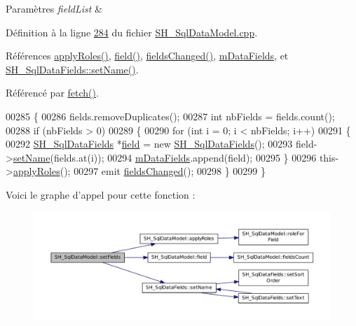 \begin{DoxyParams}{Paramètres}
{\em field\-List} & \\
\hline
\end{DoxyParams}


Définition à la ligne \hyperlink{SH__SqlDataModel_8cpp_source_l00284}{284} du fichier \hyperlink{SH__SqlDataModel_8cpp_source}{S\-H\-\_\-\-Sql\-Data\-Model.\-cpp}.



Références \hyperlink{classSH__SqlDataModel_ad4f032ceb7c2f70b2d7388e3afd161ab}{apply\-Roles()}, \hyperlink{classSH__SqlDataModel_a92c51d5c1f6aca08a7ee566ece1e4cb6}{field()}, \hyperlink{classSH__SqlDataModel_a34a4750c1fb9c7ed05fe869d6de84e28}{fields\-Changed()}, \hyperlink{classSH__SqlDataModel_a3e998f75dd5b3193783612002461888d}{m\-Data\-Fields}, et \hyperlink{classSH__SqlDataFields_a8d7b864a4ad5513af9e4c47a0d9919e8}{S\-H\-\_\-\-Sql\-Data\-Fields\-::set\-Name()}.



Référencé par \hyperlink{classSH__SqlDataModel_ab6c206088250a66ddc8cb8d33a38e421}{fetch()}.


\begin{DoxyCode}
00285 \{
00286     fields.removeDuplicates();
00287     \textcolor{keywordtype}{int} nbFields = fields.count();
00288     \textcolor{keywordflow}{if} (nbFields > 0)
00289     \{
00290         \textcolor{keywordflow}{for} (\textcolor{keywordtype}{int} i = 0; i < nbFields; i++)
00291         \{
00292             \hyperlink{classSH__SqlDataFields}{SH\_SqlDataFields} *\hyperlink{classSH__SqlDataModel_a92c51d5c1f6aca08a7ee566ece1e4cb6}{field} = \textcolor{keyword}{new} \hyperlink{classSH__SqlDataFields}{SH\_SqlDataFields}();
00293             field->\hyperlink{classSH__SqlDataFields_a8d7b864a4ad5513af9e4c47a0d9919e8}{setName}(fields.at(i));
00294             \hyperlink{classSH__SqlDataModel_a3e998f75dd5b3193783612002461888d}{mDataFields}.append(field);
00295         \}
00296         this->\hyperlink{classSH__SqlDataModel_ad4f032ceb7c2f70b2d7388e3afd161ab}{applyRoles}();
00297         emit \hyperlink{classSH__SqlDataModel_a34a4750c1fb9c7ed05fe869d6de84e28}{fieldsChanged}();
00298     \}
00299 \}
\end{DoxyCode}


Voici le graphe d'appel pour cette fonction \-:\nopagebreak
\begin{figure}[H]
\begin{center}
\leavevmode
\includegraphics[width=350pt]{classSH__SqlDataModel_ad297d359375d55e66493ce8935f8ff05_cgraph}
\end{center}
\end{figure}




